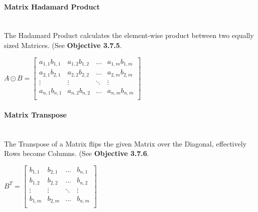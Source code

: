 \begin{flushleft}
                \paragraph{Matrix Hadamard Product} \mbox{} \\
                    \vspace{0.2cm}
                    The Hadamard Product calculates the element-wise product between two equally sized Matrices. (See \textbf{Objective 3.7.5}.\\

                    \begin{center}
                        $
                        A \odot B =
                        \begin{bmatrix}
                            a_{1,1}b_{1,1} & a_{1,2}b_{1,2} & \hdots  & a_{1,m}b_{1,m} \\
                            a_{2,1}b_{2,1} & a_{2,2}b_{2,2} & \hdots  & a_{2,m}b_{2,m} \\
                            \vdots         & \vdots         & \ddots  & \vdots         \\
                            a_{n,1}b_{n,1} & a_{n,2}b_{n,2} & \hdots  & a_{n,m}b_{n,m} \\
                        \end{bmatrix}
                        $
                    \end{center}

                \paragraph{Matrix Transpose} \mbox{} \\
                    \vspace{0.2cm}
                    The Transpose of a Matrix flips the given Matrix over the Diagonal, effectively Rows become Columns. (See \textbf{Objective 3.7.6}.\\

                    \begin{center}
                        $
                        B^{T} = 
                        \begin{bmatrix}
                            b_{1,1} & b_{2,1} & \hdots  & b_{n,1} \\
                            b_{1,2} & b_{2,2} & \hdots  & b_{n,2} \\
                            \vdots  & \vdots  & \ddots  & \vdots  \\
                            b_{1,m} & b_{2,m} & \hdots  & b_{n,m} \\
                        \end{bmatrix}
                        $
                    \end{center}           

\end{flushleft}
